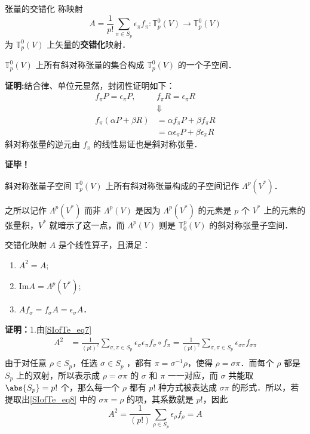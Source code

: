 \begin{definition}{张量的交错化}\label{SIofTe_def1}
称映射
\begin{equation}\label{SIofTe_eq7}
A=\frac{1}{p!}\sum_{\pi\in S_p}\epsilon_\pi f_\pi:\mathbb{T}_p^0(V)\rightarrow\mathbb{T}_p^0(V)
\end{equation}
为 $\mathbb{T}_p^0(V)$ 上矢量的\textbf{交错化}映射．
\end{definition}
\begin{theorem}{}
$\mathbb{T}_p^0(V)$ 上所有斜对称张量的集合构成 $\mathbb{T}_p^0(V)$ 的一个子空间．
\end{theorem}
\textbf{证明:}结合律、单位元显然，封闭性证明如下：
\begin{equation}
\begin{aligned}
f_\pi P=\epsilon_\pi P,\quad&f_\pi R=\epsilon_\pi R\\
&\Downarrow\\
f_\pi(\alpha P+\beta R)&=\alpha f_\pi P+\beta f_\pi R\\
&=\alpha \epsilon_\pi P+\beta \epsilon_\pi R
\end{aligned}
\end{equation}
斜对称张量的逆元由 $f_\pi$ 的线性易证也是斜对称张量．

\textbf{证毕！}
\begin{definition}{斜对称张量子空间}
$\mathbb{T}_p^0(V)$ 上所有斜对称张量构成的子空间记作 $\Lambda^p(V^*)$．
\end{definition}
之所以记作  $\Lambda^p(V^*)$ 而非  $\Lambda^p(V)$ 是因为  $\Lambda^p(V^*)$ 的元素是 $p$ 个 $V^*$ 上的元素的张量积，$V^*$ 就暗示了这一点，而 $\Lambda^p(V)$ 则是 $\mathbb{T}_0^p(V)$ 的斜对称张量子空间．

\begin{theorem}{}\label{SIofTe_the1}
交错化映射 $A$ 是个线性算子，且满足：
\begin{enumerate}
\item $A^2=A$;
\item $\mathrm{Im} A=\Lambda^p(V^*)$;
\item $Af_\sigma=f_\sigma A=\epsilon_\sigma A$．
\end{enumerate}
\end{theorem}
\textbf{证明：}1.由\autoref{SIofTe_eq7} 
\begin{equation}\label{SIofTe_eq8}
\begin{aligned}
A^2&=\frac{1}{(p!)^2}\sum_{\sigma,\pi\in S_p}\epsilon_\sigma\epsilon_\pi f_\sigma\circ f_\pi=\frac{1}{(p!)^2}\sum_{\sigma,\pi\in S_p}\epsilon_{\sigma\pi} f_{\sigma\pi}\\
\end{aligned}
\end{equation}
由于对任意 $\rho\in S_p$，任选 $\sigma\in S_p$ ，都有 $\pi=\sigma^{-1}\rho$，使得 $\rho=\sigma\pi$．而每个 $\rho$ 都是 $S_p$ 上的双射，所以表示成 $\rho=\sigma\pi$ 的 $\sigma$ 和 $\pi$ 一一对应，而 $\sigma$ 共能取 $\abs{S_p}=p!$ 个，那么每一个 $\rho$ 都有 $p!$ 种方式被表达成 $\sigma \pi$ 的形式．所以，若提取出\autoref{SIofTe_eq8} 中的 $\sigma\pi=\rho$ 的项，其系数就是 $p!$，因此
\begin{equation}
A^2=\frac{1}{(p!)}\sum_{\rho\in S_p}\epsilon_\rho f_\rho=A
\end{equation}

